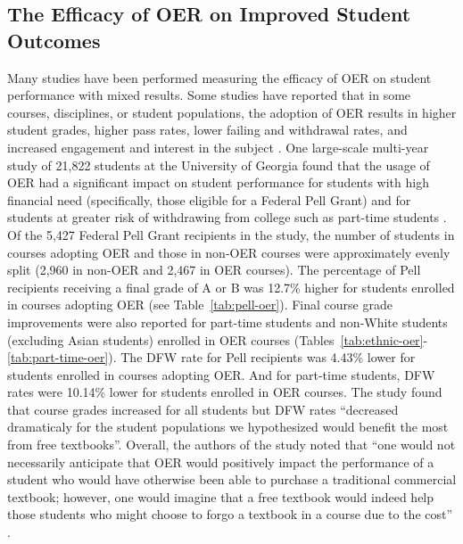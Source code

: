 \documentclass[11pt]{article}
\begin{document}
\subsection{The Efficacy of OER on Improved Student Outcomes}
Many studies have been performed measuring the efficacy of OER on student performance with mixed results.  Some studies have reported that in some courses, disciplines, or student populations, the adoption of OER results in higher student grades, higher pass rates, lower failing and withdrawal rates, and increased engagement and interest in the subject \cite{MC:17, AF-MM:12, KG-WD:17, JH-CL:12, JH-LF-DW:16, RJ-FD-RL-KP:18, OO-CH:17, NP-DB:13, RF-RP-BD:15, LF-JH:15, RP:15, TR:15, CB-WC-PH:18}.  One large-scale multi-year study of 21,822 students at the University of Georgia found that the usage of OER had a significant impact on student performance for students with high financial need (specifically, those eligible for a Federal Pell Grant) and for students at greater risk of withdrawing from college such as part-time students \cite{CB-WC-PH:18}.  Of the 5,427 Federal Pell Grant recipients in the study, the number of students in courses adopting OER and those in non-OER courses were approximately evenly split (2,960 in non-OER and 2,467 in OER courses).  The percentage of Pell recipients receiving a final grade of A or B was 12.7\% higher for students enrolled in courses adopting OER (see Table~\ref{tab:pell-oer}).  Final course grade improvements were also reported for part-time students and non-White students (excluding Asian students) enrolled in OER courses (Tables~\ref{tab:ethnic-oer}-\ref{tab:part-time-oer}).  The DFW rate for Pell recipients was 4.43\% lower for students enrolled in courses adopting OER.  And for part-time students, DFW rates were 10.14\% lower for students enrolled in OER courses. The study found that course grades increased for all students but DFW rates ``decreased dramaticaly for the student populations we hypothesized would benefit the most from free textbooks''. Overall, the authors of the study noted that ``one would not necessarily anticipate that OER would positively impact the performance of a student who would have otherwise been able to purchase a traditional commercial textbook; however, one would imagine that a free textbook would indeed help those students who might choose to forgo a textbook in a course due to the cost'' \cite{CB-WC-PH:18}.
\end{document}
